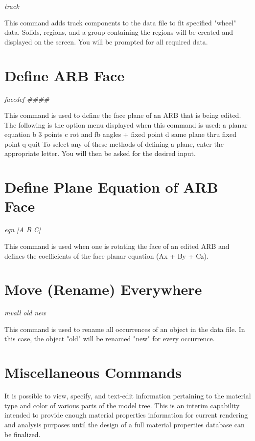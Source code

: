 {\em \center
track
}

This command adds track components to the data file to fit specified
"wheel" data.
Solids, regions, and a group containing the regions will be created and
displayed on the screen.
You will be prompted for all required data.

\section{Define ARB Face}

{\em \center
facedef \#\#\#\#
}

This command is used to define the face plane of an ARB that is being edited.
The following is the option menu displayed when this command is used:
        a     planar equation
        b     3 points
        c     rot and fb angles + fixed point
        d     same plane thru fixed point
        q     quit
To select any of these methods of defining a plane, enter the appropriate
letter.  You will then be asked for the desired input.

\section{Define Plane Equation of ARB Face}

{\em \center
eqn [A B C]
}

This command is used when one is rotating the face of an edited ARB and defines
the coefficients of the face planar equation (Ax + By + Cz).

\section{Move (Rename) Everywhere}

{\em \center
mvall old new
}

This command is used to rename all occurrences of an object in the data file.  In this
case, the object "old" will be renamed "new" for every occurrence.

\section{Miscellaneous Commands}

It is possible to view, specify, and text-edit
information pertaining to the material type and color of various
parts of the model tree.  This is an interim capability
intended to provide enough material properties information for
current rendering and analysis purposes until the design of a
full material properties database can be finalized.

